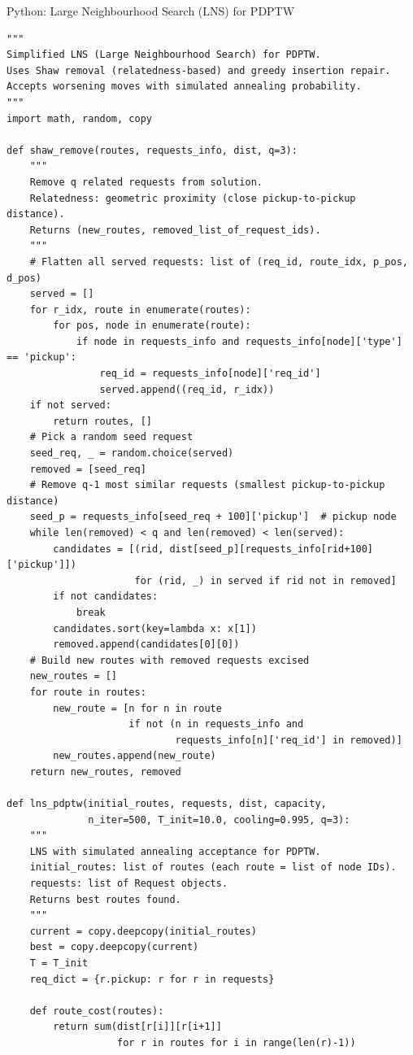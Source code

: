 \documentclass[aspectratio=169,10pt]{beamer}
\begin{document}
\begin{frame}[fragile]{Python: Large Neighbourhood Search (LNS) for PDPTW}
\begin{lstlisting}
"""
Simplified LNS (Large Neighbourhood Search) for PDPTW.
Uses Shaw removal (relatedness-based) and greedy insertion repair.
Accepts worsening moves with simulated annealing probability.
"""
import math, random, copy

def shaw_remove(routes, requests_info, dist, q=3):
    """
    Remove q related requests from solution.
    Relatedness: geometric proximity (close pickup-to-pickup distance).
    Returns (new_routes, removed_list_of_request_ids).
    """
    # Flatten all served requests: list of (req_id, route_idx, p_pos, d_pos)
    served = []
    for r_idx, route in enumerate(routes):
        for pos, node in enumerate(route):
            if node in requests_info and requests_info[node]['type'] == 'pickup':
                req_id = requests_info[node]['req_id']
                served.append((req_id, r_idx))
    if not served:
        return routes, []
    # Pick a random seed request
    seed_req, _ = random.choice(served)
    removed = [seed_req]
    # Remove q-1 most similar requests (smallest pickup-to-pickup distance)
    seed_p = requests_info[seed_req + 100]['pickup']  # pickup node
    while len(removed) < q and len(removed) < len(served):
        candidates = [(rid, dist[seed_p][requests_info[rid+100]['pickup']])
                      for (rid, _) in served if rid not in removed]
        if not candidates:
            break
        candidates.sort(key=lambda x: x[1])
        removed.append(candidates[0][0])
    # Build new routes with removed requests excised
    new_routes = []
    for route in routes:
        new_route = [n for n in route
                     if not (n in requests_info and
                             requests_info[n]['req_id'] in removed)]
        new_routes.append(new_route)
    return new_routes, removed

def lns_pdptw(initial_routes, requests, dist, capacity,
              n_iter=500, T_init=10.0, cooling=0.995, q=3):
    """
    LNS with simulated annealing acceptance for PDPTW.
    initial_routes: list of routes (each route = list of node IDs).
    requests: list of Request objects.
    Returns best routes found.
    """
    current = copy.deepcopy(initial_routes)
    best = copy.deepcopy(current)
    T = T_init
    req_dict = {r.pickup: r for r in requests}

    def route_cost(routes):
        return sum(dist[r[i]][r[i+1]]
                   for r in routes for i in range(len(r)-1))


\end{lstlisting}
\end{frame}
\end{document}
